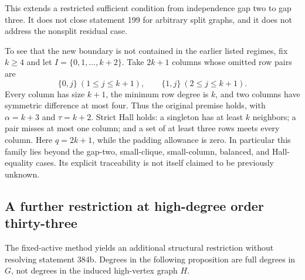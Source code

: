 \documentclass[11pt,a4paper]{article}
\theoremstyle{definition}\newtheorem{definition}[theorem]{Definition}
\theoremstyle{remark}\newtheorem{remark}[theorem]{Remark}
\begin{document}
This extends a restricted sufficient condition from independence gap two
to gap three. It does not close statement 199 for arbitrary split graphs,
and it does not address the nonsplit residual case.

To see that the new boundary is not contained in the earlier listed
regimes, fix $k\ge4$ and let $I=\{0,1,\ldots,k+2\}$. Take $2k+1$
columns whose omitted row pairs are
\[
 \{0,j\}\ (1\le j\le k+1),\qquad
 \{1,j\}\ (2\le j\le k+1).
\]
Every column has size $k+1$, the minimum row degree is $k$, and
two columns have symmetric difference at most four. Thus the original
premise holds, with $\alpha=k+3$ and $\tau=k+2$. Strict Hall holds:
a singleton has at least $k$ neighbors; a pair misses at most one
column; and a set of at least three rows meets every column.
Here $q=2k+1$, while the padding allowance is zero. In particular this
family lies beyond the gap-two, small-clique, small-column, balanced,
and Hall-equality cases. Its explicit traceability is not itself claimed
to be previously unknown.



\subsection{A further restriction at high-degree order thirty-three}
\label{r12:384h33}
The fixed-active method yields an additional structural restriction without
resolving statement 384b. Degrees in the following proposition are full
degrees in $G$, not degrees in the induced high-vertex graph $H$.
\end{document}
